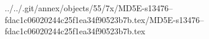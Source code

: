 ../../.git/annex/objects/55/7x/MD5E-s13476--fdac1c06020244c25f1ea34f90523b7b.tex/MD5E-s13476--fdac1c06020244c25f1ea34f90523b7b.tex